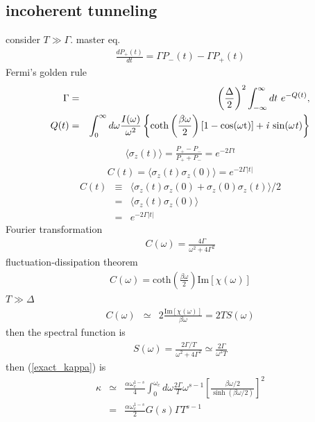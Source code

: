 \subsection{incoherent  tunneling}
consider $T \gg \Gamma$. master eq.
\begin{eqnarray}
	\frac{dP_+(t)}{dt}=\Gamma P_-(t) - \Gamma P_+(t)
\end{eqnarray}
Fermi's golden rule
\begin{eqnarray}
	\Gamma&=&\left({\frac{\Delta}{2}}\right)^2\int_{-\infty}^{\infty}dt \ e^{-Q(t)},\label{Gamma} \\
		Q(t)&=&\int_{0}^{\infty}d\omega \frac{I(\omega)}{\omega^2}\left \{ \mathrm{coth\left(\frac{\beta \omega}{2}\right)[1-\mathrm{cos}(\omega t)]+\it{i} \ \mathrm{ sin}(\omega t)}\right \}
\end{eqnarray}
\begin{eqnarray}
	\langle\sigma_z(t)\rangle=\frac{P_+-P_-}{P_++P_-} =e^{-2\Gamma t}
	\label{sigma_z}
\end{eqnarray}
\begin{eqnarray}
	C(t)=\langle \sigma_z(t) \sigma_z(0) \rangle=e^{-2\Gamma|t|}  
\end{eqnarray}
\begin{eqnarray}
	C(t)&\equiv&\langle\sigma_z(t)\sigma_z(0)+\sigma_z(0)\sigma_z(t)\rangle/2\\
		&=&\langle \sigma_z(t) \sigma_z(0) \rangle\\
		&=&e^{-2\Gamma|t|}
\end{eqnarray}
Fourier transformation
\begin{eqnarray}
	C(\omega)=\frac{4\Gamma}{\omega^2+4 \Gamma^2}
\end{eqnarray}
fluctuation-dissipation theorem
\begin{eqnarray}
	 C(\omega)=\mathrm{coth}\left(\frac{\beta\omega}{2}\right)\mathrm{Im}[\chi(\omega)]
\end{eqnarray}
$T\gg\Delta$
\begin{eqnarray}
	C(\omega)&\simeq& 2\frac{\mathrm{Im}[\chi(\omega)]}{\beta \omega}=2TS(\omega)
\end{eqnarray}
then the spectral function is
\begin{eqnarray}
	S(\omega)=\frac{2\Gamma/T}{\omega^2+4\Gamma^2}\simeq \frac{2\Gamma}{\omega^2T}
\end{eqnarray}
then (\ref{exact_kappa}) is 
\begin{eqnarray}
	\kappa&\simeq&\frac{\alpha\omega_c^{1-s}}{4}\int_{0}^{\omega_c}d\omega \frac{2\Gamma}{T}\omega^{s-1}\left[\frac{\beta\omega/2}{\sinh{(\beta\omega/2)}}\right]^{2}\\
	&=&\frac{\alpha\omega_c^{1-s}}{2}G(s)\Gamma T^{s-1}	
\end{eqnarray}
